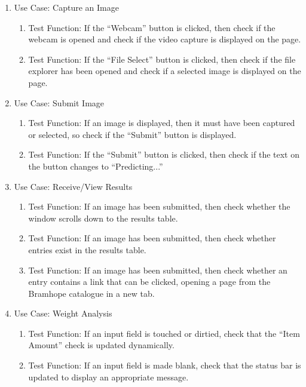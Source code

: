 \documentclass[a4paper, 11pt]{article}
\begin{document}
        \begin{enumerate}
            \item Use Case: Capture an Image
                \begin{enumerate}
                    \item Test Function: If the “Webcam” button is clicked, then check if the webcam is opened and check if the video capture is displayed on the page.
                    \item Test Function: If the “File Select” button is clicked, then check if the file explorer has been opened and check if a selected image is displayed on the page.
                \end{enumerate}
            \item Use Case: Submit Image
                \begin{enumerate}
                    \item Test Function: If an image is displayed, then it must have been captured or selected, so check if the “Submit” button is displayed.
                    \item Test Function: If the “Submit” button is clicked, then check if the text on the button changes to “Predicting...”
                \end{enumerate}
            \item Use Case: Receive/View Results
                \begin{enumerate}
                    \item Test Function: If an image has been submitted, then check whether the window scrolls down to the results table.
                    \item Test Function: If an image has been submitted, then check whether entries exist in the results table.
                    \item Test Function: If an image has been submitted, then check whether an entry contains a link that can be clicked, opening a page from the Bramhope catalogue in a new tab.
                \end{enumerate}
            \item Use Case: Weight Analysis
                \begin{enumerate}
                    \item Test Function: If an input field is touched or dirtied, check that the “Item Amount” check is updated dynamically.
                    \item Test Function: If an input field is made blank, check that the status bar is updated to display an appropriate message.

\end{enumerate}
\end{enumerate}
\end{document}
